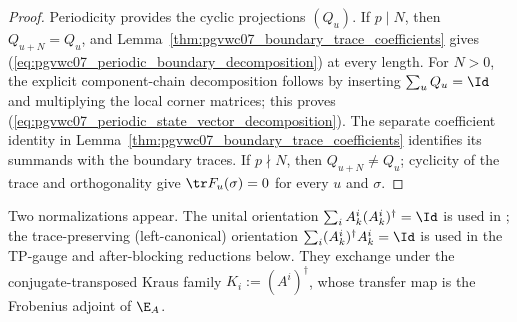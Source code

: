 \begin{proof}
    \leanok
    Periodicity provides the cyclic projections $(Q_u)$. If $p\mid N$, then
    $Q_{u+N}=Q_u$, and Lemma~\ref{thm:pgvwc07_boundary_trace_coefficients}
    gives (\ref{eq:pgvwc07_periodic_boundary_decomposition}) at every length.
    For $N>0$, the explicit component-chain decomposition follows by inserting
    $\sum_uQ_u=\Id$ and multiplying the local corner matrices; this proves
    (\ref{eq:pgvwc07_periodic_state_vector_decomposition}). The separate
    coefficient identity in Lemma~\ref{thm:pgvwc07_boundary_trace_coefficients}
    identifies its summands with the boundary traces. If $p\nmid N$, then
    $Q_{u+N}\ne Q_u$; cyclicity of the trace and orthogonality give
    $\tr F_u(\sigma)=0$ for every $u$ and $\sigma$.
\end{proof}



Two normalizations appear. The unital orientation
$\sum_i A_k^i(A_k^i)^\dagger=\Id$ is used in
\cite[Theorem~4]{PerezGarcia2007Matrix}; the trace-preserving
(left-canonical) orientation $\sum_i (A_k^i)^\dagger A_k^i=\Id$ is used in the
TP-gauge and after-blocking reductions below. They exchange under the
conjugate-transposed Kraus family $K_i:=(A^i)^\dagger$, whose transfer map is the
Frobenius adjoint of $\E_A$.



